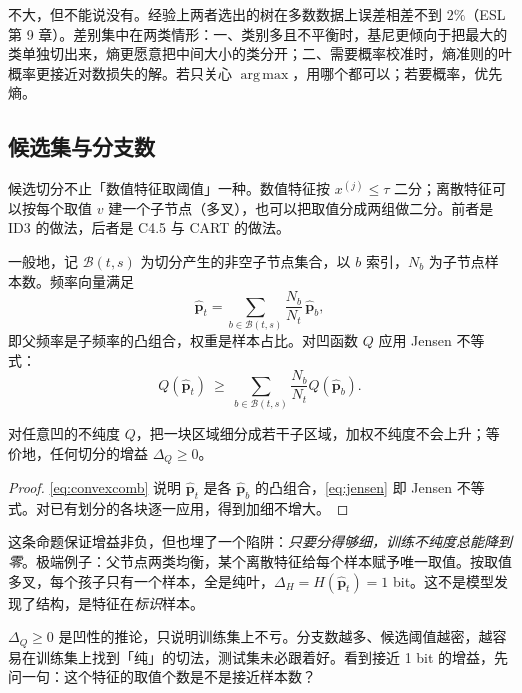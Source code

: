 \documentclass[11pt,a4paper,fontset=windows,zihao=-4]{ctexart}
\newcommand{\bp}{\mathbf{p}}
\DeclareMathOperator*{\argmax}{arg\,max}
\newcommand{\Bcal}{\mathcal{B}}
\begin{document}
\begin{add}[基尼与熵的差别有多大]
不大，但不能说没有。经验上两者选出的树在多数数据上误差相差不到 $2\%$（ESL 第 9 章）。差别集中在两类情形：一、类别多且不平衡时，基尼更倾向于把最大的类单独切出来，熵更愿意把中间大小的类分开；二、需要概率校准时，熵准则的叶概率更接近对数损失的解。若只关心 $\argmax$，用哪个都可以；若要概率，优先熵。
\end{add}

\subsection{候选集与分支数}

候选切分不止「数值特征取阈值」一种。数值特征按 $x^{(j)}\le\tau$ 二分；离散特征可以按每个取值 $v$ 建一个子节点（多叉），也可以把取值分成两组做二分。前者是 ID3 的做法，后者是 C4.5 与 CART 的做法。

一般地，记 $\Bcal(t,s)$ 为切分产生的非空子节点集合，以 $b$ 索引，$N_b$ 为子节点样本数。频率向量满足
\begin{equation}
  \widehat{\bp}_t=\sum_{b\in\Bcal(t,s)}\frac{N_b}{N_t}\,\widehat{\bp}_b ,
  \label{eq:convexcomb}
\end{equation}
即父频率是子频率的凸组合，权重是样本占比。对凹函数 $Q$ 应用 Jensen 不等式：
\begin{equation}
  Q(\widehat{\bp}_t)
  \ \ge\ \sum_{b\in\Bcal(t,s)}\frac{N_b}{N_t}Q(\widehat{\bp}_b).
  \label{eq:jensen}
\end{equation}

\begin{prop}[加细划分不增大加权不纯度]
对任意凹的不纯度 $Q$，把一块区域细分成若干子区域，加权不纯度不会上升；等价地，任何切分的增益 $\Delta_Q\ge0$。
\end{prop}

\begin{proof}
\eqref{eq:convexcomb} 说明 $\widehat{\bp}_t$ 是各 $\widehat{\bp}_b$ 的凸组合，\eqref{eq:jensen} 即 Jensen 不等式。对已有划分的各块逐一应用，得到加细不增大。
\end{proof}

这条命题保证增益非负，但也埋了一个陷阱：\emph{只要分得够细，训练不纯度总能降到零}。极端例子：父节点两类均衡，某个离散特征给每个样本赋予唯一取值。按取值多叉，每个孩子只有一个样本，全是纯叶，$\Delta_H=H(\widehat{\bp}_t)=1$ bit。这不是模型发现了结构，是特征在\emph{标识}样本。

\begin{warn}
$\Delta_Q\ge0$ 是凹性的推论，只说明训练集上不亏。分支数越多、候选阈值越密，越容易在训练集上找到「纯」的切法，测试集未必跟着好。看到接近 1 bit 的增益，先问一句：这个特征的取值个数是不是接近样本数？
\end{warn}
\end{document}
